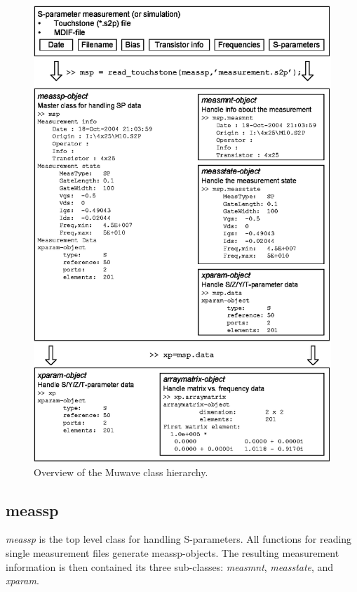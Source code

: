 \begin{figure}[htbf]
  \includegraphics[width=\textwidth]{Figures/ClassOverview3.eps}
  \caption{Overview of the Muwave class hierarchy.}\label{fig:ClassHierarchy}
\end{figure}

\subsection{meassp}
\emph{meassp} is the top level class for handling S-parameters.
All functions for reading single measurement files generate
meassp-objects. The resulting measurement information is then
contained its three sub-classes: \emph{measmnt}, \emph{measstate},
and \emph{xparam}.

